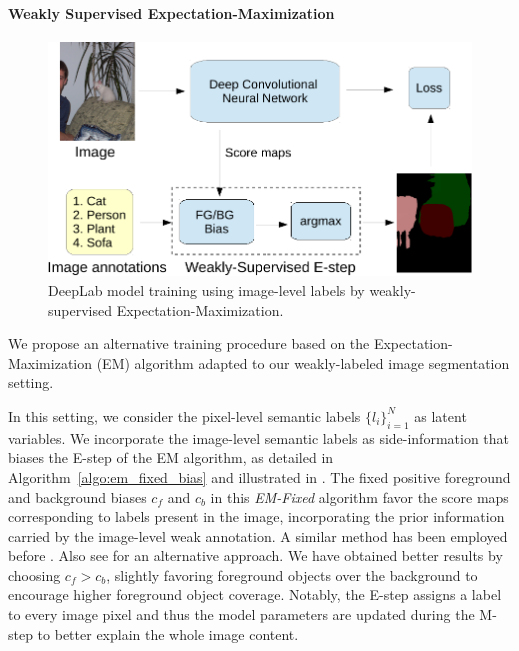 \paragraph{Weakly Supervised Expectation-Maximization}

\begin{figure}[tbp!]
  \centering
  \includegraphics[width=0.9\linewidth]{fig/model_train_image.pdf} 
  \caption{DeepLab model training using image-level labels by
    weakly-supervised Expectation-Maximization.}
  \label{fig:model_train_image}
\end{figure}

We propose an alternative training procedure based on the
Expectation-Maximization (EM) algorithm adapted to our weakly-labeled
image segmentation setting.

In this setting, we consider the pixel-level semantic labels
$\{l_i\}_{i=1}^N$ as latent variables. We incorporate the image-level
semantic labels as side-information that biases the E-step of the EM
algorithm, as detailed in Algorithm~\ref{algo:em_fixed_bias} and
illustrated in . The fixed positive
foreground and background biases $c_f$ and $c_b$ in this
\textsl{EM-Fixed} algorithm favor the score maps corresponding to
labels present in the image, incorporating the prior information
carried by the image-level weak annotation. A similar method has
been employed before \citep{Lu2013sports}. Also see
\citet{cour2011learning} for an alternative approach. We have
obtained better results by choosing $c_f > c_b$, slightly favoring
foreground objects over the background to encourage higher foreground
object coverage. Notably, the E-step assigns a label to every image
pixel and thus the model parameters are updated during the M-step to
better explain the whole image content.


